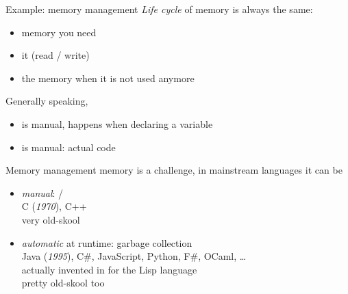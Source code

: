 \documentclass[10pt]{beamer}
\begin{document}
\begin{frame}{Example: memory management}
  \emph{Life cycle} of memory is always the same:
  \smallskip
  \begin{itemize}
    \item {} memory you need
    \item {} it (read / write)
    \item {} the memory when it is not used anymore
  \end{itemize}
  \medskip

  Generally speaking,
  \begin{itemize}
    \item {} is manual, happens when declaring a variable
    \item {} is manual: actual code
  \end{itemize}
\end{frame}



\begin{frame}{Memory management}
   memory is a challenge, in mainstream languages it can be
  \medskip
  \begin{itemize}\bigsep
    \item \emph{manual}:  / \\
      \prompt C (\emph{1970}), C++\\
      very old-skool
    \item \emph{automatic} at runtime: garbage collection\\
      \prompt Java (\emph{1995}), C\#, JavaScript, Python, F\#, OCaml, \ldots\\
      \pause
      actually invented in  for the Lisp language\\
      pretty old-skool too
  \end{itemize}
\end{frame}
\end{document}
